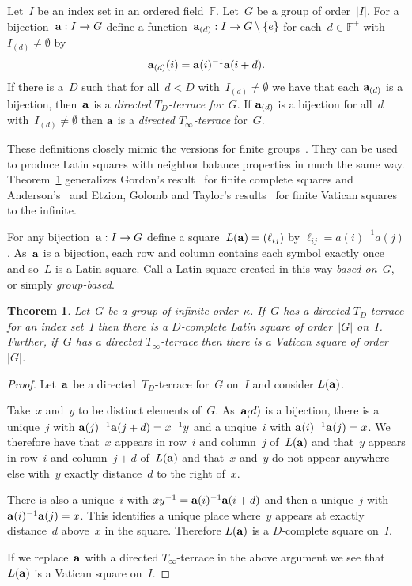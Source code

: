 \documentclass[12pt,a4paper]{article}
\newtheorem{thm}{Theorem}[section]
\newcommand{\F}{\mathbb{F}}
\begin{document}
Let~$I$ be an index set in an ordered field~$\F$.  Let~$G$ be a group of order~$|I|$.  For a bijection~${\bf a}: I \rightarrow G$ define a function~${\bf a}_{(d)}: I \rightarrow G \setminus \{ e \}$ for each~$d \in \F^+$ with~$I_{(d)} \neq \emptyset$ by
$${\bf a}_{(d)}(i) = {\bf a}(i)^{-1}{\bf a}(i+d).$$
If there is a~$D$ such that for all~$d < D$ with~$I_{(d)} \neq \emptyset$ we have that each ${\bf a}_{(d)}$ is a bijection, then~${\bf a}$ is a {\em directed $T_D$-terrace for~$G$}.  If ${\bf a}_{(d)}$ is a bijection for all~$d$  with~$I_{(d)} \neq \emptyset$ then ${\bf a}$ is  a {\em directed $T_{\infty}$-terrace} for~$G$.

These definitions closely mimic the versions for finite groups~\cite{Anderson90}.   They can be used to produce Latin squares with neighbor balance properties in much the same way.  Theorem~\ref{th:terrace2square} generalizes Gordon's result~\cite{Gordon61} for finite complete squares and Anderson's~\cite{Anderson90} and Etzion, Golomb and Taylor's results~\cite{EGT89} for finite Vatican squares to the infinite.  

For any bijection~${\bf a}: I \rightarrow G$ define a square~$L({\bf a}) = (\ell_{ij})$ by $\ell_{ij} = a(i)^{-1}a(j)$.   As~${\bf a}$ is a bijection, each row and column contains each symbol exactly once and so~$L$ is a Latin square.  Call a Latin square created in this way {\em based on~$G$}, or simply {\em group-based}.

\begin{thm}\label{th:terrace2square}
Let~$G$ be a group of infinite order~$\kappa$.  If~$G$ has a directed $T_{D}$-terrace for an index set~$I$ then there is a $D$-complete Latin square of order~$|G|$ on~$I$.  Further, if~$G$ has a directed $T_{\infty}$-terrace then there is a Vatican square of order~$|G|$.
\end{thm}

\begin{proof}
Let~${\bf a}$ be a directed~$T_D$-terrace for~$G$ on~$I$ and consider $L({\bf a})$.

Take~$x$ and~$y$ to be distinct elements of~$G$.  As~${\bf a}_(d)$ is a bijection, there is a unique~$j$ with ${\bf a}(j)^{-1}{\bf a}(j+d) = x^{-1}y$ and a unqiue~$i$ with ${\bf a}(i)^{-1}{\bf a}(j)=x$.  We therefore have that~$x$ appears in row~$i$ and column~$j$ of~$L({\bf a})$ and that~$y$ appears in row~$i$ and column~$j+d$ of~$L({\bf a})$ and that~$x$ and~$y$ do not appear anywhere else with~$y$ exactly distance~$d$  to the right of~$x$.

There is also a unique~$i$ with $xy^{-1} = {\bf a}(i)^{-1}{\bf a}(i+d)$ and then a unique~$j$ with ${\bf a}(i)^{-1}{\bf a}(j)=x$.  This identifies a unique place where~$y$ appears at exactly distance~$d$ above~$x$ in the square.  Therefore $L({\bf a})$ is a $D$-complete square on~$I$.

If we replace~${\bf a}$ with a directed $T_{\infty}$-terrace in the above argument we see that~$L({\bf a})$ is a Vatican square on~$I$.
\end{proof}
\end{document}

